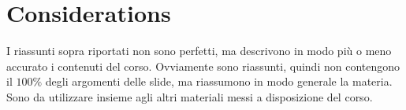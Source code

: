 \newpage
\section*{Considerations}
I riassunti sopra riportati non sono perfetti, ma descrivono in modo più o meno accurato i contenuti del corso. Ovviamente sono riassunti, quindi non contengono il $ 100\% $ degli argomenti delle slide, ma riassumono in modo generale la materia. Sono da utilizzare insieme agli altri materiali messi a disposizione del corso.